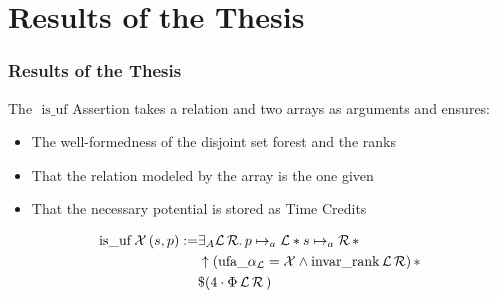 \section{Results of the Thesis}
\begin{frame}
	\frametitle{Results of the Thesis}
	The $\,\,\mathrm{is\_uf}$ Assertion takes a relation and two arrays as arguments and ensures:\begin{itemize}
		\item The well-formedness of the disjoint set forest and the ranks
		\item That the relation modeled by the array is the one given
		\item That the necessary potential is stored as Time Credits
	\end{itemize}
	\vspace{0.6cm}
	\begin{dfn}
	\begin{align}
	\begin{split}
	\mathrm{is\_uf}\, \mathcal{X} \, (s,p) := 
	&\exists_A \mathcal{L}\, \mathcal{R}.\, p \mapsto_a \mathcal{L} * s \mapsto_a \mathcal{R}\, * \\
	&\uparrow (\mathrm{ufa\_}\alpha_\mathcal{L} = \mathcal{X} \land \mathrm{invar\_rank}\, \mathcal{L} \, \mathcal{R})\, * \\
	&\$(4\cdot\Phi\, \mathcal{L}\, \mathcal{R}\,)
	\end{split}
	\end{align}
	\end{dfn}
\vspace{-0.5cm}
\end{frame}

